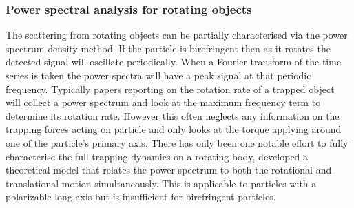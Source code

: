 \subsubsection{Power spectral analysis for rotating objects}
The scattering from rotating objects can be partially characterised via
the power spectrum density method. If the particle is birefringent then
as it rotates the detected signal will oscillate periodically. When a 
Fourier transform of the time series is taken the power spectra will 
have a peak signal at that periodic frequency. Typically papers 
reporting on the rotation rate of a trapped object will collect a power spectrum and look at the maximum frequency term to determine its rotation rate. However this often neglects any information on the trapping forces acting on particle and only looks at the torque applying around one of the particle's primary axis. There has only been one notable effort to fully characterise the full trapping dynamics on a rotating body, \cite{Yogesha2012} developed a theoretical model that relates the power spectrum to both the rotational and translational motion simultaneously. This is applicable to particles with a polarizable long axis but is insufficient for birefringent particles.


